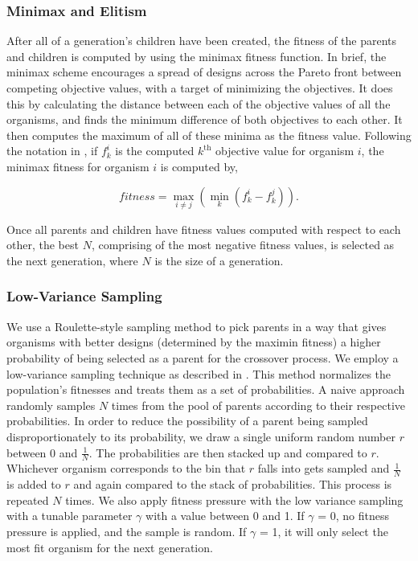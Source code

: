 \documentclass[letterpaper, 10 pt, conference]{ieeeconf}  %
\begin{document}
\subsubsection{Minimax and Elitism}

After all of a generation's children have been created, the fitness of the parents and children is computed by using the minimax fitness function. In brief, the minimax scheme encourages a spread of designs across the Pareto front between competing objective values, with a target of minimizing the objectives. It does this by calculating the distance between each of the objective values of all the organisms, and finds the minimum difference of both objectives to each other. It then computes the maximum of all of these minima as the fitness value. Following the notation in \cite{Parkinson2019}, if $f_k^i$ is the computed $k^{\mathrm{th}}$ objective value for organism $i$, the minimax fitness for organism $i$ is computed by,

\begin{equation}%
    fitness = \max_{i \neq j}\left(\min_{k}\left(f_k^i - f_k^j\right)\right).
\end{equation}

Once all parents and children have fitness values computed with respect to each other, the best $N$, comprising of the most negative fitness values, is selected as the next generation, where $N$ is the size of a generation.

\subsubsection{Low-Variance Sampling}

We use a Roulette-style sampling method to pick parents in a way that gives organisms with better designs (determined by the maximin fitness) a higher probability of being selected as a parent for the crossover process. We employ a low-variance sampling technique as described in \cite{Thrun2006}. This method normalizes the population's fitnesses and treats them as a set of probabilities. A naive approach randomly samples $N$ times from the pool of parents according to their respective probabilities. In order to reduce the possibility of a parent being sampled disproportionately to its probability, we draw a single uniform random number $r$ between 0 and $\tfrac{1}{N}$. The probabilities are then stacked up and compared to $r$. Whichever organism corresponds to the bin that $r$ falls into gets sampled and $\tfrac{1}{N}$ is added to $r$ and again compared to the stack of probabilities. This process is repeated $N$ times. We also apply fitness pressure with the low variance sampling with a tunable parameter $\gamma$ with a value between 0 and 1. If $\gamma$ = 0, no fitness pressure is applied, and the sample is random. If $\gamma$ = 1, it will only select the most fit organism for the next generation.
\end{document}
